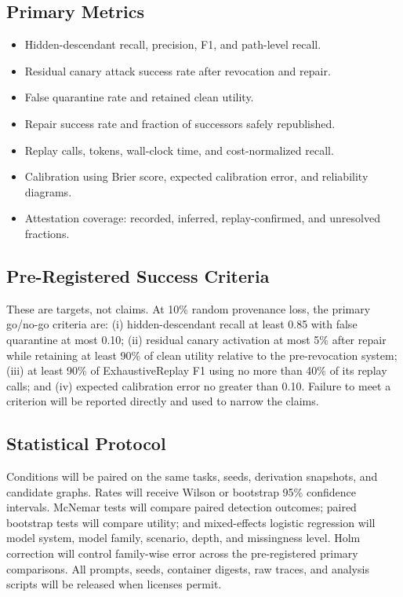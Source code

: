 \documentclass[11pt]{article}
\begin{document}
\subsection{Primary Metrics}
\begin{itemize}
\item Hidden-descendant recall, precision, F1, and path-level recall.
\item Residual canary attack success rate after revocation and repair.
\item False quarantine rate and retained clean utility.
\item Repair success rate and fraction of successors safely republished.
\item Replay calls, tokens, wall-clock time, and cost-normalized recall.
\item Calibration using Brier score, expected calibration error, and reliability diagrams.
\item Attestation coverage: recorded, inferred, replay-confirmed, and unresolved fractions.
\end{itemize}

\subsection{Pre-Registered Success Criteria}
These are targets, not claims. At 10\% random provenance loss, the primary go/no-go criteria are: (i) hidden-descendant recall at least 0.85 with false quarantine at most 0.10; (ii) residual canary activation at most 5\% after repair while retaining at least 90\% of clean utility relative to the pre-revocation system; (iii) at least 90\% of ExhaustiveReplay F1 using no more than 40\% of its replay calls; and (iv) expected calibration error no greater than 0.10. Failure to meet a criterion will be reported directly and used to narrow the claims.

\subsection{Statistical Protocol}
Conditions will be paired on the same tasks, seeds, derivation snapshots, and candidate graphs. Rates will receive Wilson or bootstrap 95\% confidence intervals. McNemar tests will compare paired detection outcomes; paired bootstrap tests will compare utility; and mixed-effects logistic regression will model system, model family, scenario, depth, and missingness level. Holm correction will control family-wise error across the pre-registered primary comparisons. All prompts, seeds, container digests, raw traces, and analysis scripts will be released when licenses permit.
\end{document}
